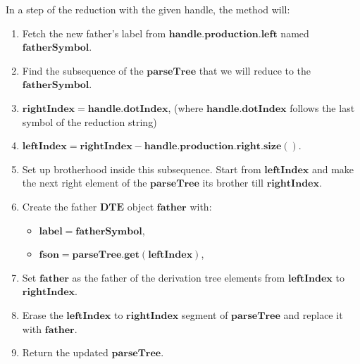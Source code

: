 In a step of the reduction with the given handle, the method will:
\begin{enumerate}
    \item Fetch the new father’s label from \(\boldsymbol{handle.production.left}\) named \(\boldsymbol{fatherSymbol}\).
    \item Find the subsequence of the \(\boldsymbol{parseTree}\) that we will reduce to the \(\boldsymbol{fatherSymbol}\).
    \item \(\boldsymbol{rightIndex = handle.dotIndex}\), (where \(\boldsymbol{handle.dotIndex}\) follows the last symbol of the reduction string)
    \item \(\boldsymbol{leftIndex = rightIndex - handle.production.right.size()}\).
    \item Set up brotherhood inside this subsequence. Start from \(\boldsymbol{leftIndex}\) and make the next right element of the \(\boldsymbol{parseTree}\) its brother till \(\boldsymbol{rightIndex}\).
    \item Create the father \(\boldsymbol{DTE}\) object \(\boldsymbol{father}\) with:
    \begin{itemize}
        \item \(\boldsymbol{label = fatherSymbol}\),
        \item \(\boldsymbol{fson = parseTree.get(leftIndex)}\),
    \end{itemize}
    \item Set \(\boldsymbol{father}\) as the father of the derivation tree elements from \(\boldsymbol{leftIndex}\) to \(\boldsymbol{rightIndex}\).
    \item Erase the \(\boldsymbol{leftIndex}\) to \(\boldsymbol{rightIndex}\) segment of \(\boldsymbol{parseTree}\) and replace it with \(\boldsymbol{father}\).
    \item Return the updated \(\boldsymbol{parseTree}\).
\end{enumerate}

\vspace{10pt}

